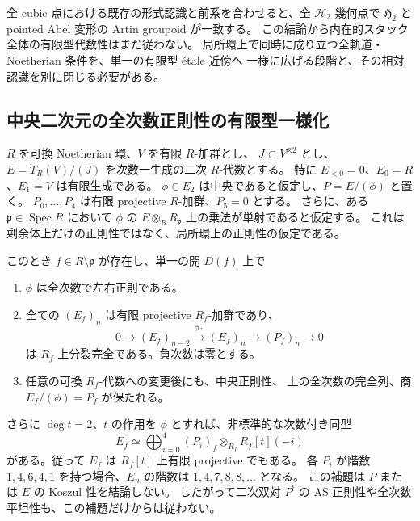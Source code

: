 \begin{remark}[形式的完了と代数性の区別]
全 cubic 点における既存の形式認識と前系を合わせると、全 \(\mathcal H_2\) 幾何点で
\(\mathfrak H_2\) と pointed Abel 変形の Artin groupoid が一致する。
この結論から内在的スタック全体の有限型代数性はまだ従わない。
局所環上で同時に成り立つ全軌道・Noetherian 条件を、単一の有限型 étale 近傍へ
一様に広げる段階と、その相対認識を別に閉じる必要がある。
\end{remark}

\subsection{中央二次元の全次数正則性の有限型一様化}

\begin{lemma}[有限な二次商から中央正則線を一様化する]
\label{lem:spread-central-regular-line}
$R$ を可換 Noetherian 環、$V$ を有限 $R$-加群とし、
$J\subset V^{\otimes2}$ とし、$E=T_R(V)/(J)$ を次数一生成の二次 $R$-代数とする。
特に $E_{<0}=0$、$E_0=R$、$E_1=V$ は有限生成である。
$\phi\in E_2$ は中央であると仮定し、$P=E/(\phi)$ と置く。
$P_0,\ldots,P_4$ は有限 projective $R$-加群、$P_5=0$ とする。
さらに、ある $\mathfrak p\in\operatorname{Spec}R$ において
$\phi$ の $E\otimes_RR_{\mathfrak p}$ 上の乗法が単射であると仮定する。
これは剰余体上だけの正則性ではなく、局所環上の正則性の仮定である。

このとき $f\in R\setminus\mathfrak p$ が存在し、単一の開 $D(f)$ 上で
\begin{enumerate}
\item $\phi$ は全次数で左右正則である。
\item 全ての $(E_f)_n$ は有限 projective $R_f$-加群であり、
  \[
  0\longrightarrow(E_f)_{n-2}\xrightarrow{\phi\cdot}(E_f)_n
       \longrightarrow(P_f)_n\longrightarrow0
  \tag{SC-exact}\label{eq:spread-central-regular-sequence}
  \]
  は $R_f$ 上分裂完全である。負次数は零とする。
\item 任意の可換 $R_f$-代数への変更後にも、中央正則性、
  上の全次数の完全列、商 $E_f/(\phi)=P_f$ が保たれる。
\end{enumerate}
さらに $\deg t=2$、$t$ の作用を $\phi$ とすれば、非標準的な次数付き同型
\[
 E_f\simeq\bigoplus_{i=0}^4(P_i)_f\otimes_{R_f}R_f[t](-i)
 \tag{SC-module}\label{eq:spread-central-projective-module}
\]
がある。従って $E_f$ は $R_f[t]$ 上有限 projective でもある。
各 $P_i$ が階数 $1,4,6,4,1$ を持つ場合、$E_n$ の階数は
$1,4,7,8,8,\ldots$ となる。
この補題は $P$ または $E$ の Koszul 性を結論しない。
したがって二次双対 $P^!$ の AS 正則性や全次数平坦性も、この補題だけからは従わない。
\end{lemma}

